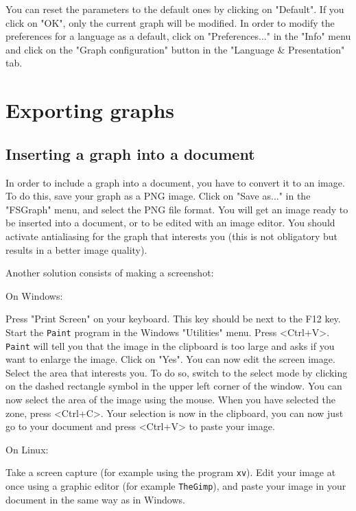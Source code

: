 \bigskip
\noindent You can reset the parameters to the default ones by clicking on
"Default". If you click on "OK", only the current graph will be modified.  In
order to modify the preferences for a language as a default, click on
"Preferences..." in the "Info" menu and click on the "Graph configuration" button 
in the "Language \& Presentation" tab.


\section{Exporting graphs}
\subsection{Inserting a graph into a document}
In order to include a graph into a document, you have to convert it to an image.
To do this, save your graph as a PNG image. Click on "Save as..." in the
"FSGraph" menu, and select the PNG file format. You will get an image ready to be
inserted into a document, or to be edited with an image editor. You should
activate antialiasing for the graph that interests you (this is not obligatory
but results in a better image quality).

\bigskip
\noindent Another solution consists of making a screenshot:

\bigskip
\noindent On Windows:

\bigskip
\noindent Press "Print Screen" on your keyboard. This key should be next to the
F12 key. Start the \verb+Paint+ program in the Windows "Utilities" menu. Press
<Ctrl+V>. \verb+Paint+ will tell you that the image in the clipboard is too large
and asks if you want to enlarge the image. Click on "Yes". You can now edit the
screen image. Select the area that interests you. To do so, switch to the select
mode by clicking on the dashed rectangle symbol in the upper left corner of the
window. You can now select the area of the image using the mouse. When you have
selected the zone, press <Ctrl+C>. Your selection is now in the clipboard, you
can now just go to your document and press <Ctrl+V> to paste your image.

\bigskip
\noindent On Linux:

\bigskip
\noindent Take a screen capture (for example using the program \verb+xv+). Edit
your image at once using a graphic editor (for example \verb+TheGimp+), and paste
your image in your document in the same way as in Windows.

